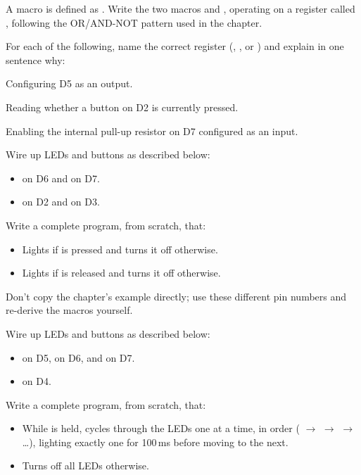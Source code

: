 \label{c2:ex:2}
A macro is defined as . Write the two macros  and
, operating on a register called , following the OR/AND-NOT pattern used
in the chapter.

\label{c2:set:2}

\label{c2:ex:3}
For each of the following, name the correct register (, , or )
and explain in one sentence why:
\begin{parts}
  \item Configuring D5 as an output.
  \item Reading whether a button on D2 is currently pressed.
  \item Enabling the internal pull-up resistor on D7 configured as an input.
\end{parts}

\label{c2:set:3}

\label{c2:ex:4}
Wire up LEDs and buttons as described below:
\begin{itemize}
  \item {} on D6 and  on D7.
  \item {} on D2 and  on D3.
\end{itemize}
Write a complete program, from scratch, that:
\begin{itemize}
  \item Lights  if  is pressed and turns it off otherwise.
  \item Lights  if  is released and turns it off otherwise.
\end{itemize}
Don't copy the chapter's example directly; use these different pin numbers and re-derive the
macros yourself.

\label{c2:ex:5}
Wire up LEDs and buttons as described below:
\begin{itemize}
  \item {} on D5,  on D6, and  on D7.
  \item {} on D4.
\end{itemize}
Write a complete program, from scratch, that:
\begin{itemize}
  \item While  is held, cycles through the LEDs one at a time, in order (
    $\rightarrow$  $\rightarrow$  $\rightarrow$  \dots), lighting
    exactly one for 100\,ms before moving to the next.
  \item Turns off all LEDs otherwise.
\end{itemize}
